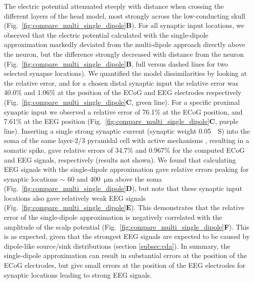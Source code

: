 \documentclass[preprint,10pt,authoryear]{elsarticle}
\newcommand{\hlp}[2][Purple]{ {\sethlcolor{#1} \hl{#2}} }
\newcommand{\sntxt}[1]{{\color{NavyBlue}#1}}
\newcommand{\gen}[1]{\color{white}{\hlp{GTE: #1 }}\color{black}}
\begin{document}
The electric potential attenuated steeply with distance when crossing the different layers of the head model, most strongly across the low-conducting skull (Fig.~\ref{fig:compare_multi_single_dipole}\textbf{B}). 
For all synaptic input locations, we observed that the electric potential calculated with the single-dipole approximation markedly deviated from the multi-dipole approach directly above the neuron, but the difference strongly decreased with distance from the neuron 
(Fig.~\ref{fig:compare_multi_single_dipole}\textbf{B}, full versus dashed lines for two selected synapse locations). 
We quantified the model dissimilarities by looking at the relative error, and for a chosen distal synaptic input the relative error was 40.0\% and 1.06\% at the position of the ECoG and EEG electrodes respectively (Fig.~\ref{fig:compare_multi_single_dipole}\textbf{C}, green line). For a specific proximal synaptic input we observed a relative error of 76.1$\%$ at the ECoG position, and 7.61$\%$ at the EEG position (Fig.~\ref{fig:compare_multi_single_dipole}\textbf{C}, purple line). Inserting a single strong synaptic current (synaptic weight 0.05~\si{\mu S}) into the soma of the same layer-2/3 pyramidal cell with active mechanisms \citep{EYAL2018}, resulting in a somatic spike, gave relative errors of 34.7$\%$ and 0.967$\%$ for the computed ECoG and EEG signals, respectively (results not shown).
We found that calculating EEG signals with the single-dipole approximation gave relative errors peaking for synaptic locations $\sim$ 60 and 400~$\si{\um}$ above the soma (Fig.~\ref{fig:compare_multi_single_dipole}\textbf{D}),
but note that these synaptic input locations also gave relatively weak EEG signals (Fig.~\ref{fig:compare_multi_single_dipole}\textbf{E}).
This demonstrates that the relative error of the single-dipole approximation is negatively correlated with the amplitude of the scalp potential (Fig.~\ref{fig:compare_multi_single_dipole}\textbf{F}).
This is as expected, given that the strongest EEG signals are expected to be caused by dipole-like source/sink distributions (section \ref{subsec:cda}).
\sntxt{In summary, the single-dipole approximation can result in substantial errors at the position of the ECoG electrodes, but give small errors at the position of the EEG electrodes for synaptic locations leading to strong EEG signals.}
\end{document}

